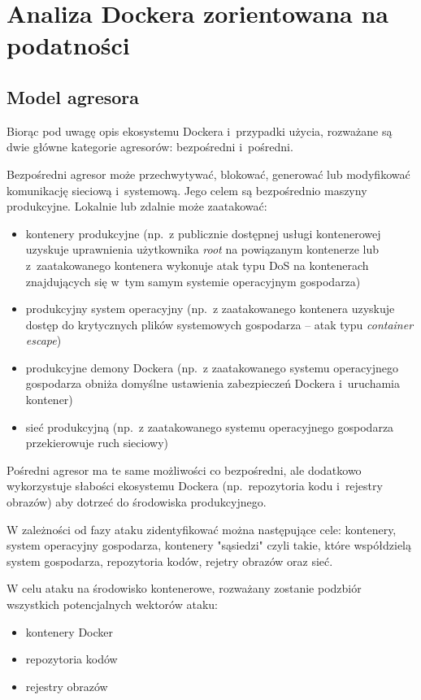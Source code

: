 \chapter{Analiza Dockera zorientowana na podatności}

\section{Model agresora}

Biorąc pod uwagę opis ekosystemu Dockera i~przypadki użycia, rozważane są dwie główne kategorie agresorów: bezpośredni i~pośredni.

Bezpośredni agresor może przechwytywać, blokować, generować lub modyfikować komunikację sieciową i~systemową. Jego celem są bezpośrednio maszyny produkcyjne. Lokalnie lub zdalnie może zaatakować:

\begin{itemize}
    \item kontenery produkcyjne (np.~z publicznie dostępnej usługi kontenerowej uzyskuje uprawnienia użytkownika \textit{root} na powiązanym kontenerze lub z~zaatakowanego kontenera wykonuje atak typu DoS na kontenerach znajdujących się w~tym samym systemie operacyjnym gospodarza)
    \item produkcyjny system operacyjny (np.~z zaatakowanego kontenera uzyskuje dostęp do krytycznych plików systemowych gospodarza -- atak typu \textit{container escape})
    \item produkcyjne demony Dockera (np.~z zaatakowanego systemu operacyjnego gospodarza obniża domyślne ustawienia zabezpieczeń Dockera i~uruchamia kontener)
    \item sieć produkcyjną (np.~z zaatakowanego systemu operacyjnego gospodarza przekierowuje ruch sieciowy)
\end{itemize}

Pośredni agresor ma te same możliwości co bezpośredni, ale dodatkowo wykorzystuje słabości ekosystemu Dockera (np.~repozytoria kodu i~rejestry obrazów) aby dotrzeć do środowiska produkcyjnego.

W zależności od fazy ataku zidentyfikować można następujące cele: kontenery, system operacyjny gospodarza, kontenery "sąsiedzi" czyli takie, które współdzielą system gospodarza, repozytoria kodów, rejetry obrazów oraz sieć.

W celu ataku na środowisko kontenerowe, rozważany zostanie podzbiór wszystkich potencjalnych wektorów ataku:

\begin{itemize}
    \item kontenery Docker
    \item repozytoria kodów
    \item rejestry obrazów
\end{itemize}

